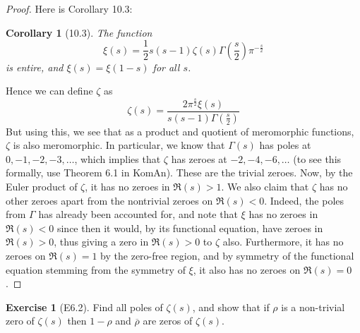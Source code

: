 \documentclass[reqno]{amsart}
\newtheorem{corollary}[theorem]{Corollary}
\theoremstyle{definition}
\newtheorem{exercise}[theorem]{Exercise}
\theoremstyle{remark}
\begin{document}
\begin{proof}
    Here is Corollary 10.3:
    \begin{corollary}[10.3]
        The function
        \[
        \xi(s) = \frac{1}{2} s(s-1) \zeta(s)
        \Gamma \left( \frac{s}{2} \right) 
        \pi^{-\frac{s}{2}}
        \] 
        is entire, and
        $\xi(s) = \xi (1-s)$ for all $s$.
    \end{corollary}
    Hence we can define $\zeta$ as
    \[
    \zeta(s) = \frac{ 2 \pi^{\frac{s}{2}} \xi(s)}{s (s-1)
    \Gamma (\frac{s}{2})}
    \] 
    But using this, we see that
    as a product and quotient of meromorphic functions, 
    $\zeta$ is also meromorphic. In particular,
    we know that $\Gamma (s)$ has poles
    at $0, -1,-2,-3,\ldots$, which implies that
    $\zeta$ has zeroes at
    $-2, -4, -6, \ldots$ (to see this formally, use
    Theorem 6.1 in KomAn). These are the
    trivial zeroes. Now, by the Euler product
    of $\zeta$, it has no zeroes 
    in $\Re(s) > 1$. We also claim that
    $\zeta$ has no other zeroes apart from the
    nontrivial zeroes on $\Re(s) < 0$.
    Indeed, the poles from $\Gamma$ has already been
    accounted for, and
    note that $\xi$ has no zeroes in
    $\Re(s) < 0$ since then it would, by
    its functional equation, have zeroes in
    $\Re(s) > 0$, thus giving a zero
    in $\Re(s) > 0$ to $\zeta$ also. 
    Furthermore, it has no
    zeroes on $\Re(s) = 1$ by the zero-free region, and
    by symmetry of the functional equation stemming
    from the symmetry of $\xi$, it also has no
    zeroes on $\Re(s) = 0$.
\end{proof}

\begin{exercise}[E6.2]
    Find all poles of $\zeta(s)$, and show that if
    $\rho$ is a non-trivial zero
    of $\zeta (s)$ then
    $1- \rho $ and $\overline{\rho }$ are zeros
    of $\zeta(s)$.
\end{exercise}
\end{document}
